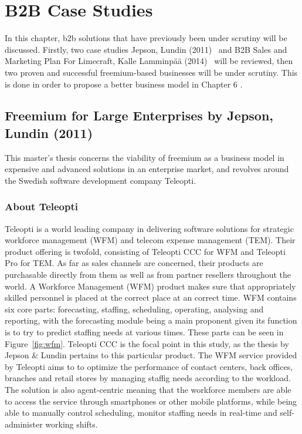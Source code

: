 \chapter{B2B Case Studies}
In this chapter, \gls{b2b} solutions that have previously been under scrutiny will be discussed. Firstly, two case studies Jepson, Lundin (2011)~\cite{jepson2009freemium} and B2B Sales and Marketing Plan For Limecraft, Kalle Lamminpää (2014)~\cite{lamminpaa2014b2b} will be reviewed, then two proven and successful freemium-based businesses will be under scrutiny. This is done in order to propose a better business model in Chapter 6
.
\section{Freemium for Large Enterprises by Jepson, Lundin (2011)}
This master's thesis concerns the viability of freemium as a business model in expensive and advanced solutions in an enterprise market, and revolves around the Swedish software development company Teleopti.

\subsection{About Teleopti}
Teleopti is a world leading company in delivering software solutions for strategic workforce management (WFM) and telecom expense management (TEM). Their product offering is twofold, consisting of Teleopti CCC for WFM and Teleopti Pro for TEM. As far as sales channels are concerned, their products are purchasable directly from them as well as from partner resellers throughout the world. A Workforce Management (WFM) product makes sure that appropriately skilled personnel is placed at the correct place at an correct time. WFM contains six core parts: forecasting, staffing, scheduling, operating, analysing and reporting, with the forecasting module being a main proponent given its function is to try to predict staffing needs at various times. These parts can be seen in Figure~\ref{fig:wfm}. Teleopti CCC is the focal point in this study, as the thesis by Jepson \& Lundin pertains to this particular product. The WFM service provided by Teleopti aims to to optimize the performance of contact centers, back offices, branches and retail stores by managing staffig needs according to the workload. The solution is also agent-centric meaning that the workforce members are able to access the service through smartphones or other mobile platforms, while being able to manually control scheduling, monitor staffing needs in real-time and self-administer working shifts.  

